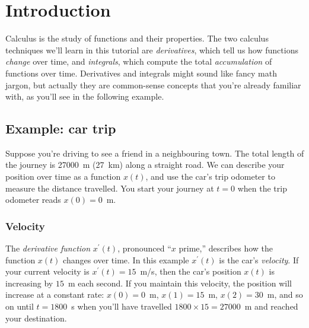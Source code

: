 

\section{Introduction}

	Calculus is the study of functions and their properties.
	The two calculus techniques we'll learn in this tutorial
	are \emph{derivatives},
	which tell us how functions \emph{change} over time,
	and \emph{integrals},
	which compute the total \emph{accumulation} of functions over time.
	Derivatives and integrals might sound like fancy math jargon,
	but actually they are common-sense concepts
	that you're already familiar with,
	as you'll see in the following example.





	\subsection{Example: car trip}
	\label{introduction:car_example}
	
		Suppose you're driving to see a friend in a neighbouring town.
		The total length of the journey is 27000~m (27~km) along a straight road.
		We can describe your position over time as a function $x(t)$,
		and use the car's trip odometer to measure the distance travelled.
		You start your journey at $t=0$
		when the trip odometer reads $x(0)=0$~m.
	
		\subsubsection{Velocity}
		\label{introduction:car_velocity}
	
			The \emph{derivative function} $x^{\prime\!}(t)$,
			pronounced ``\:\!\!$x$ prime,''
			describes how the function $x(t)$ changes over time.
			In this example $x^{\prime\!}(t)$ is the car's \emph{velocity}.
			If your current velocity is $x^{\prime\!}(t)=15$~m/s,		%
			then the car's position $x(t)$ is increasing by $15$~m each second.
			If you maintain this velocity,
			the position will increase at a constant rate:
			$x(0)=0$~m, $x(1)=15$~m, $x(2)=30$~m, %
			and so on until $t=1800$~s %
			when you'll have travelled $1800\times 15 = 27000$~m
			and reached your destination.
	
